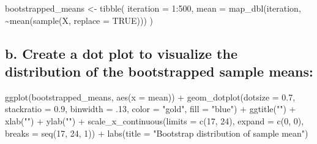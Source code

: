 \documentclass[
]{book}
\newenvironment{Shaded}{\begin{snugshade}}{\end{snugshade}}
\newcommand{\AttributeTok}[1]{\textcolor[rgb]{0.77,0.63,0.00}{#1}}
\newcommand{\ConstantTok}[1]{\textcolor[rgb]{0.00,0.00,0.00}{#1}}
\newcommand{\DecValTok}[1]{\textcolor[rgb]{0.00,0.00,0.81}{#1}}
\newcommand{\FloatTok}[1]{\textcolor[rgb]{0.00,0.00,0.81}{#1}}
\newcommand{\FunctionTok}[1]{\textcolor[rgb]{0.00,0.00,0.00}{#1}}
\newcommand{\NormalTok}[1]{#1}
\newcommand{\OtherTok}[1]{\textcolor[rgb]{0.56,0.35,0.01}{#1}}
\newcommand{\SpecialCharTok}[1]{\textcolor[rgb]{0.00,0.00,0.00}{#1}}
\newcommand{\StringTok}[1]{\textcolor[rgb]{0.31,0.60,0.02}{#1}}
\begin{document}
\begin{Shaded}
\begin{Highlighting}[]
\NormalTok{bootstrapped\_means }\OtherTok{\textless{}{-}} \FunctionTok{tibble}\NormalTok{(}
  \AttributeTok{iteration =} \DecValTok{1}\SpecialCharTok{:}\DecValTok{500}\NormalTok{,}
  \AttributeTok{mean =} \FunctionTok{map\_dbl}\NormalTok{(iteration, }
                 \SpecialCharTok{\textasciitilde{}}\FunctionTok{mean}\NormalTok{(}\FunctionTok{sample}\NormalTok{(X, }\AttributeTok{replace =} \ConstantTok{TRUE}\NormalTok{)))}
\NormalTok{)}
\end{Highlighting}
\end{Shaded}

\hypertarget{b.-create-a-dot-plot-to-visualize-the-distribution-of-the-bootstrapped-sample-means}{%
\subsection{b. Create a dot plot to visualize the distribution of the bootstrapped sample means:}\label{b.-create-a-dot-plot-to-visualize-the-distribution-of-the-bootstrapped-sample-means}}

\begin{Shaded}
\begin{Highlighting}[]
\FunctionTok{ggplot}\NormalTok{(bootstrapped\_means, }\FunctionTok{aes}\NormalTok{(}\AttributeTok{x =}\NormalTok{ mean)) }\SpecialCharTok{+}
  \FunctionTok{geom\_dotplot}\NormalTok{(}\AttributeTok{dotsize =} \FloatTok{0.7}\NormalTok{, }
               \AttributeTok{stackratio =} \FloatTok{0.9}\NormalTok{, }
               \AttributeTok{binwidth =}\NormalTok{ .}\DecValTok{13}\NormalTok{, }
               \AttributeTok{color =} \StringTok{"gold"}\NormalTok{, }
               \AttributeTok{fill =} \StringTok{"blue"}\NormalTok{) }\SpecialCharTok{+}
  \FunctionTok{ggtitle}\NormalTok{(}\StringTok{""}\NormalTok{) }\SpecialCharTok{+} \FunctionTok{xlab}\NormalTok{(}\StringTok{""}\NormalTok{) }\SpecialCharTok{+} \FunctionTok{ylab}\NormalTok{(}\StringTok{""}\NormalTok{) }\SpecialCharTok{+}
  \FunctionTok{scale\_x\_continuous}\NormalTok{(}\AttributeTok{limits =} \FunctionTok{c}\NormalTok{(}\DecValTok{17}\NormalTok{, }\DecValTok{24}\NormalTok{), }
                     \AttributeTok{expand =} \FunctionTok{c}\NormalTok{(}\DecValTok{0}\NormalTok{, }\DecValTok{0}\NormalTok{), }
                     \AttributeTok{breaks =} \FunctionTok{seq}\NormalTok{(}\DecValTok{17}\NormalTok{, }\DecValTok{24}\NormalTok{, }\DecValTok{1}\NormalTok{)) }\SpecialCharTok{+}
  \FunctionTok{labs}\NormalTok{(}\AttributeTok{title =} \StringTok{"Bootstrap distribution of sample mean"}\NormalTok{)}
\end{Highlighting}
\end{Shaded}
\end{document}
